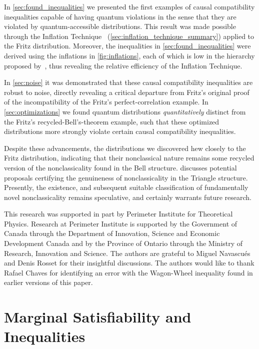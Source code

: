 \documentclass[aps, 10pt, english, twoside, pra, nofootinbib, tightenlines, longbibliography, superscriptaddress]{revtex4-1}
\begin{document}
    In \cref{sec:found_inequalities} we presented the first examples of causal compatibility inequalities capable of having quantum violations in the sense that they are violated by quantum-accessible distributions. This result was made possible through the Inflation Technique~\cite{Inflation} (\cref{sec:inflation_technique_summary}) applied to the Fritz distribution. Moreover, the inequalities in \cref{sec:found_inequalities} were derived using the inflations in \cref{fig:inflations}, each of which is low in the hierarchy proposed by~\cite{Navascues_2017}, thus revealing the relative efficiency of the Inflation Technique.

    In \cref{sec:noise} it was demonstrated that these causal compatibility inequalities are robust to noise, directly revealing a critical departure from Fritz's original proof of the incompatibility of the Fritz's perfect-correlation example. In \cref{sec:optimizations} we found quantum distributions \textit{quantitatively} distinct from the Fritz's recycled-Bell's-theorem example, such that these optimized distributions more strongly violate certain causal compatibility inequalities.

    Despite these advancements, the distributions we discovered hew closely to the Fritz distribution, indicating that their nonclassical nature remains some recycled version of the nonclassicality found in the Bell structure.  discusses potential proposals certifying the genuineness of nonclassicality in the Triangle structure. Presently, the existence, and subsequent suitable classification of fundamentally novel nonclassicality remains speculative, and certainly warrants future research.

    \begin{acknowledgments}
    This research was supported in part by Perimeter Institute for Theoretical Physics. Research at Perimeter Institute is supported by the Government of Canada through the Department of Innovation, Science and Economic Development Canada and by the Province of Ontario through the Ministry of Research, Innovation and Science. The authors are grateful to Miguel Navascués and Denis Rosset for their insightful discussions. The authors would like to thank Rafael Chaves for identifying an error with the Wagon-Wheel inequality found in earlier versions of this paper.
    \end{acknowledgments}

    \appendix

    \section{Marginal Satisfiability and Inequalities}
    \label{sec:marginal_satisfiability}
\end{document}
